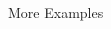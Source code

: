 \documentclass[10pt, aspectratio=169]{beamer}
\begin{document}
\begin{frame}{More Examples}
\begin{columns}
        \begin{column}{0.3\textwidth}
        \end{column}
    \end{columns}

 
\end{frame}
\end{document}
